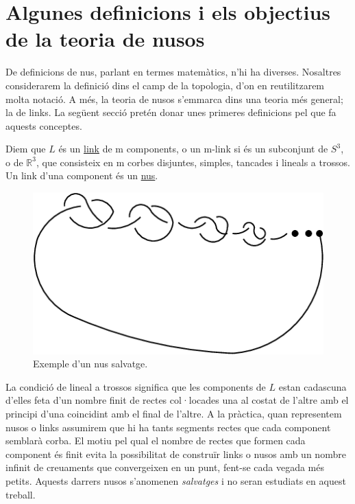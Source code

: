 
\section{Algunes definicions i els objectius de la teoria de nusos}\label{sec:Algunes definicions i els objectius de la teoria de nusos}

De definicions de nus, parlant en termes matemàtics, n'hi ha diverses. Nosaltres considerarem la definició dins el camp de la topologia, d'on en reutilitzarem molta notació. A més, la teoria de nusos s'emmarca dins una teoria més general; la de links. La següent secció pretén donar unes primeres definicions pel que fa aquests conceptes.

\begin{definition}\label{def: Definició de nus}
	Diem que $L$ és un \underline{link} de m components, o un m-link si és un subconjunt de $S^3$, o de $\mathbb{R}^3$, que consisteix en m corbes disjuntes, simples, tancades i lineals a trossos. Un link d'una component és un \underline{nus}.
\end{definition}

\begin{figure}
	\centering
	\includegraphics[width=0.9\linewidth]{img/wildknot.png}
	\caption{Exemple d'un nus salvatge.}\label{fig:nussalvatge}
\end{figure}

La condició de lineal a trossos significa que les components de $L$ estan cadascuna d'elles feta d'un nombre finit de rectes col·locades una al costat de l'altre amb el principi d'una coincidint amb el final de l'altre. A la pràctica, quan representem nusos o links assumirem que hi ha tants segments rectes que cada component semblarà corba. El motiu pel qual el nombre de rectes que formen cada component és finit evita la possibilitat de construïr links o nusos amb un nombre infinit de creuaments que convergeixen en un punt, fent-se cada vegada més petits. Aquests darrers nusos s'anomenen \textit{salvatges} i no seran estudiats en aquest treball.\\

